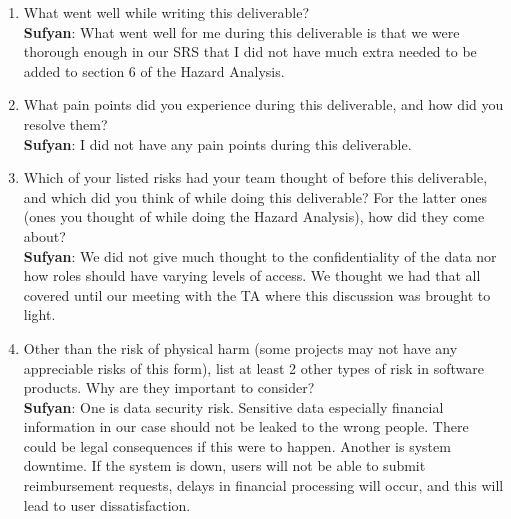 \documentclass{article}
\begin{document}
\begin{enumerate}
    \item What went well while writing this deliverable? \\ 
    \textbf{Sufyan}: What went well for me during this deliverable is that we were thorough enough in our SRS that I did not have much extra needed to be added to section 6 of the Hazard Analysis.
    \item What pain points did you experience during this deliverable, and how
    did you resolve them? \\
    \textbf{Sufyan}: I did not have any pain points during this deliverable.
    \item Which of your listed risks had your team thought of before this
    deliverable, and which did you think of while doing this deliverable? For
    the latter ones (ones you thought of while doing the Hazard Analysis), how
    did they come about? \\
    \textbf{Sufyan}: We did not give much thought to the confidentiality of the data nor how roles should have varying levels of access. We thought we had that all covered until our meeting with the TA where this discussion was brought to light.
    \item Other than the risk of physical harm (some projects may not have any
    appreciable risks of this form), list at least 2 other types of risk in
    software products. Why are they important to consider? \\
    \textbf{Sufyan}: One is data security risk. Sensitive data especially financial information in our case should not be leaked to the wrong people. There could be legal consequences if this were to happen. Another is system downtime. If the system is down, users will not be able to submit reimbursement requests, delays in financial processing will occur, and this will lead to user dissatisfaction.
\end{enumerate}
\end{document}
